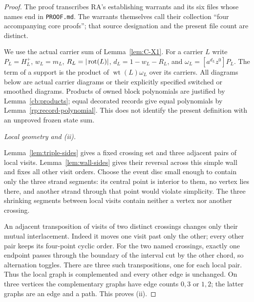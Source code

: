 \begin{proof}
The proof transcribes RA's establishing warrants and its six
files whose names end in \texttt{PROOF.md}. The warrants themselves
call their collection ``four accompanying core proofs''; that source
designation and the present file count are distinct.

We use the actual carrier sum of Lemma~\ref{lem:C-X1}. For a carrier
$L$ write $P_L=H_L^+$, $w_L=m_L$, $R_L=|\operatorname{rot}(L)|$,
$d_L=1-w_L-R_L$, and $\omega_L=[a^{d_L}z^0]P_L$.
The term of a support is the product of $\operatorname{wt}(L)\omega_L$
over its carriers. All diagrams below are actual carrier diagrams or
their explicitly specified switched or smoothed diagrams. Products of
owned block polynomials are justified by Lemma~\ref{cb:products};
equal decorated records give equal polynomials by
Lemma~\ref{rp:record-polynomial}. This does not identify the present
definition with an unproved frozen state sum.

\par\medskip\noindent\emph{Local geometry and (ii).}\par
Lemma~\ref{lem:triple-sides} gives a fixed crossing set and three
adjacent pairs of local visits. Lemma~\ref{lem:wall-sides} gives their
reversal across this simple wall and fixes all other visit orders.
Choose the event disc small enough to contain only the three strand
segments: its central point is interior to them, no vertex lies there,
and another strand through that point would violate simplicity.
The three shrinking segments between local visits contain neither a
vertex nor another crossing.

An adjacent transposition of visits of two distinct crossings changes
only their mutual interlacement. Indeed it moves one visit past only
the other; every other pair keeps its four-point cyclic order. For the
two named crossings, exactly one endpoint passes through the boundary
of the interval cut by the other chord, so alternation toggles.
There are three such transpositions, one for each local pair. Thus the
local graph is complemented and every other edge is unchanged. On
three vertices the complementary graphs have edge counts $0,3$ or
$1,2$; the latter graphs are an edge and a path. This proves (ii).


\end{proof}
